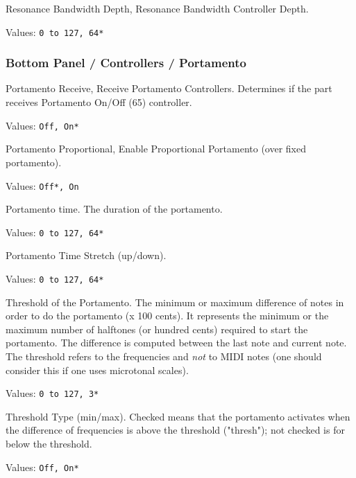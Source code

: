    Resonance Bandwidth Depth,
   Resonance Bandwidth Controller Depth.

   Values: \texttt{0 to 127, 64*}

\subsubsection{Bottom Panel / Controllers / Portamento}
\label{subsubsec:bottom_panel_controllers_portamento}

   \setcounter{ItemCounter}{0}      %

   Portamento Receive,
   Receive Portamento Controllers.
   Determines if the part receives Portamento On/Off (65) controller.

   Values: \texttt{Off, On*}

   Portamento Proportional,
   Enable Proportional Portamento (over fixed portamento).

   Values: \texttt{Off*, On}

   Portamento time.
   The duration of the portamento.

   Values: \texttt{0 to 127, 64*}

   Portamento Time Stretch (up/down).

   Values: \texttt{0 to 127, 64*}

   Threshold of the Portamento.
   The minimum or maximum difference of notes in order
   to do the portamento (x 100 cents).
   It represents the minimum or the maximum number of halftones (or hundred
   cents) required to start the portamento. The difference is computed
   between the last note and current note.
   The threshold refers to the frequencies and \textsl{not} to MIDI notes (one
   should consider this if one uses microtonal scales).

   Values: \texttt{0 to 127, 3*}

   Threshold Type (min/max).
   Checked means that the portamento activates when the difference of
   frequencies is above the threshold ("thresh"); not checked is for below
   the threshold.

   Values: \texttt{Off, On*}

